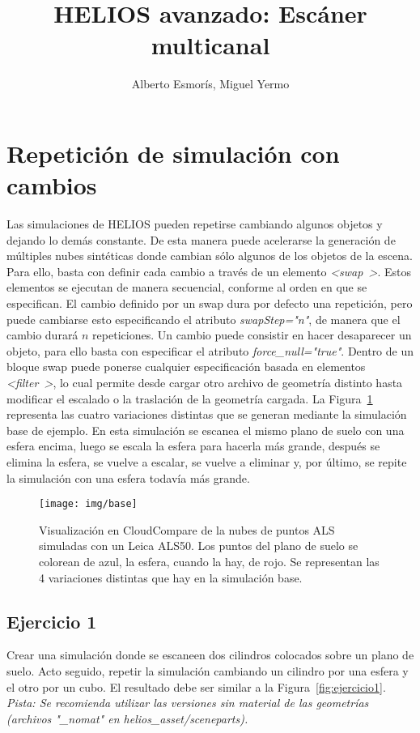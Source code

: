 \documentclass[]{article}
\title{HELIOS avanzado: Escáner multicanal}
\author{Alberto Esmorís, Miguel Yermo}
\date{}
\begin{document}
	
	\maketitle
	
	
	
	\section*{Repetición de simulación con cambios}
	Las simulaciones de HELIOS pueden repetirse cambiando algunos objetos y dejando lo demás constante. De esta manera puede acelerarse la generación de múltiples nubes sintéticas donde cambian sólo algunos de los objetos de la escena. Para ello, basta con definir cada cambio a través de un elemento \mbox{\textit{\textless swap \textgreater}}. Estos elementos se ejecutan de manera secuencial, conforme al orden en que se especifican. El cambio definido por un swap dura por defecto una repetición, pero puede cambiarse esto especificando el atributo \mbox{\textit{swapStep="n"}}, de manera que el cambio durará $n$ repeticiones. Un cambio puede consistir en hacer desaparecer un objeto, para ello basta con especificar el atributo \mbox{\textit{force\_null="true"}}. Dentro de un bloque swap puede ponerse cualquier especificación basada en elementos \mbox{\textit{\textless filter \textgreater}}, lo cual permite desde cargar otro archivo de geometría distinto hasta modificar el escalado o la traslación de la geometría cargada. La Figura~\ref{fig:cambios_base} representa las cuatro variaciones distintas que se generan mediante la simulación base de ejemplo. En esta simulación se escanea el mismo plano de suelo con una esfera encima, luego se escala la esfera para hacerla más grande, después se elimina la esfera, se vuelve a escalar, se vuelve a eliminar y, por último, se repite la simulación con una esfera todavía más grande.

	\begin{figure}[H]
		\centering
		\texttt{[image: img/base]}
		\caption{Visualización en CloudCompare de la nubes de puntos ALS simuladas con un Leica ALS50. Los puntos del plano de suelo se colorean de azul, la esfera, cuando la hay, de rojo. Se representan las 4 variaciones distintas que hay en la simulación base.}
		\label{fig:cambios_base}
	\end{figure}


	\pagebreak
	

	\subsection*{Ejercicio 1}
	Crear una simulación donde se escaneen dos cilindros colocados sobre un plano de suelo. Acto seguido, repetir la simulación cambiando un cilindro por una esfera y el otro por un cubo. El resultado debe ser similar a la Figura~\ref{fig:ejercicio1}. \textit{Pista: Se recomienda utilizar las versiones sin material de las geometrías (archivos "\_nomat" en helios\_asset/sceneparts).}
	
\end{document}
